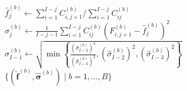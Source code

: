 \documentclass[a4paper]{book}
\begin{document}
\begin{figure}[p]
\begin{algorithm}[H]
\begin{algorithmic}
          \EndFor
          \State $\widehat{f}^{(b)}_j \gets \sum_{i = 1}^{I - j} C^{(b)}_{i, j + 1} / \sum_{i = 1}^{I - j} C^{(b)}_{ij}$
            \State $\displaystyle \widehat{\sigma}^{(b)}_j \gets \frac{1}{I - j - 1}\sum_{i = 1}^{I-j} C^{(b)}_{ij}\left( F^{(b)}_{i, j + 1} - \widehat{f}^{(b)}_j \right)^2$
          \Else
            \State $\widehat{\sigma}^{(b)}_{I - 1} \gets \sqrt{\min{ \left \{ \displaystyle \frac{(\widehat{\sigma}^{(b)}_{I - 2})^4}{(\widehat{\sigma}^{(b)}_{I - 3})^2}, (\widehat{\sigma}^{(b)}_{I - 2})^2, (\widehat{\sigma}^{(b)}_{I - 3})^2 \right \} }}$
          \EndIf
        \EndFor
      \EndFor
      \State \Return $\{ (\widehat{\bm{f}}^{(b)}, \widehat{\bm{\sigma}}^{(b)}) \mid b = 1, \dots, B \}$
    \end{algorithmic}
  \end{algorithm}
\end{figure}
\end{document}

